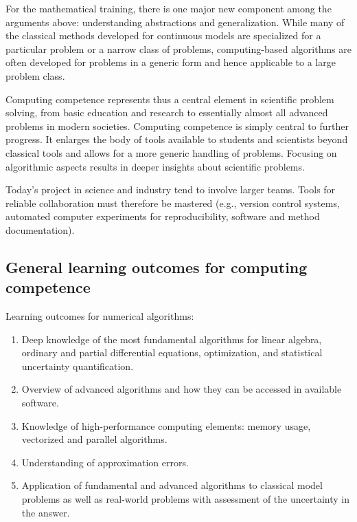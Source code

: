 \documentclass[%
oneside,                 %
final,                   %
10pt]{article}
\begin{document}
For the mathematical training, there is one major new component among the arguments above: understanding abstractions and generalization. While many of the classical methods developed for continuous models are specialized for a particular problem or a narrow class of problems, computing-based algorithms are often developed for problems in a generic form and hence applicable to a large problem class.


Computing competence represents thus a central element in scientific problem solving, from basic education and research to essentially almost all advanced problems in modern societies. Computing competence is simply central to further progress. It enlarges the body of tools available to students and scientists beyond classical tools and allows for a more generic handling of problems. Focusing on algorithmic aspects results in deeper insights about scientific problems.

Today's project in science and industry tend to involve larger teams. Tools for reliable collaboration must therefore be mastered (e.g., version control systems, automated computer experiments for reproducibility, software and method documentation).


\subsection{General learning outcomes for computing competence}

Learning outcomes for numerical algorithms:

\begin{enumerate}
\item Deep knowledge of the most fundamental algorithms for linear algebra, ordinary and partial differential equations, optimization, and statistical uncertainty quantification.

\item Overview of advanced algorithms and how they can be accessed in available software.

\item Knowledge of high-performance computing elements: memory usage, vectorized and parallel algorithms.

\item Understanding of approximation errors.

\item Application of fundamental and advanced algorithms to classical model problems as well as real-world problems with assessment of the uncertainty in the answer.
\end{enumerate}
\end{document}
